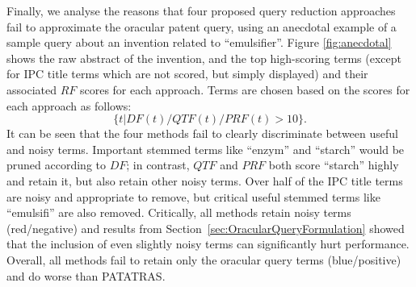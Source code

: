 Finally, we analyse the reasons that four proposed query reduction approaches fail to approximate the oracular patent query, using an anecdotal example of a sample query about an invention related to ``emulsifier''. 
Figure \ref{fig:anecdotal} shows the raw abstract of the invention, and the top high-scoring terms (except for IPC title terms which are not scored, but simply displayed) and their associated $\mathit{RF}$ scores for each approach. 
Terms are chosen based on the scores for each approach as follows: 
\begin{displaymath}\{t| DF(t)/QTF(t)/PRF(t)>10\}.\end{displaymath}
It can be seen that the four methods fail to clearly discriminate between useful and noisy terms.  Important stemmed terms like ``enzym'' and ``starch'' would be pruned according to $\mathit{DF}$; in contrast, $\mathit{QTF}$ and $\mathit{PRF}$ both score ``starch'' highly and retain it, but also retain other noisy terms.  Over half of the IPC title terms are noisy and appropriate to remove, but critical useful stemmed terms like ``emulsifi'' are also removed.
  Critically, all methods retain noisy terms (red/negative) and results from Section~\ref{sec:OracularQueryFormulation} showed that the inclusion of even slightly noisy terms can significantly hurt performance.  Overall, all methods fail to retain only the oracular query terms (blue/positive) and do worse than PATATRAS.

